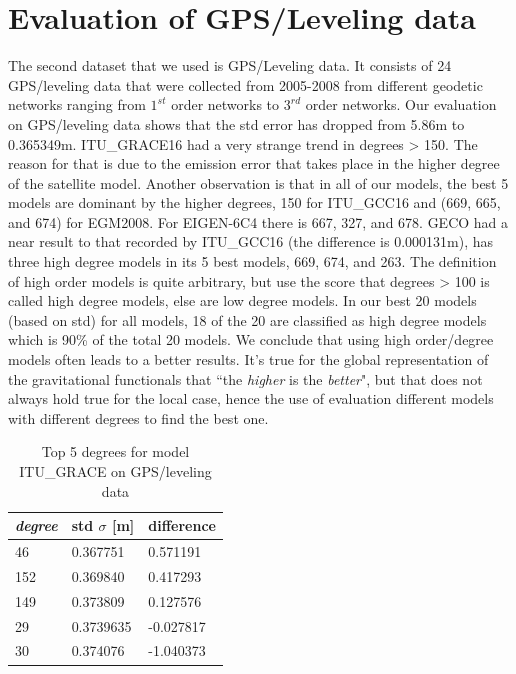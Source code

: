         \section{Evaluation of GPS/Leveling data}
        The second dataset that we used is GPS/Leveling data. It consists of 24 GPS/leveling data that were collected from 2005-2008 from different geodetic networks ranging from $1^{st}$ order networks to $3^{rd}$ order networks. Our evaluation on GPS/leveling data shows that the std error has dropped from 5.86m to 0.365349m. ITU\_GRACE16 had a very strange trend in degrees > 150. The reason for that is due to the emission error that takes place in the higher degree of the satellite model.
        Another observation is that in all of our models, the best 5 models are dominant by the higher degrees, 150 for ITU\_GCC16 and (669, 665, and 674) for EGM2008. For EIGEN-6C4 there is 667, 327, and 678. GECO had a near result to that recorded by ITU\_GCC16 (the difference is 0.000131m), has three high degree models in its 5 best models, 669, 674, and 263. The definition of high order models is quite arbitrary, but use the score that degrees > 100 is called high degree models, else are low degree models. In our best 20 models (based on std) for all models, 18 of the 20 are classified as high degree models which is 90\% of the total 20 models. We conclude that using high order/degree models often leads to a better results. It's true for the global representation of the gravitational functionals that ``the \textit{higher} is the \textit{better}", but that does not always hold true for the local case, hence the use of evaluation different models with different degrees to find the best one. 
          \begin{table}[]
          	\centering
          	\caption{Top 5 degrees for model ITU\_GRACE on GPS/leveling data}
          	\label{table:ggm_models}
          	\begin{tabular}{@{}lll@{}}
          		\toprule
          		\emph{degree} & std $\sigma$ [m]  & difference\\ \midrule
          		46 &0.367751&    0.571191\\
          		152 &0.369840&   0.417293\\
          		149 &0.373809 &  0.127576\\
          		29 &0.3739635 &  -0.027817\\
          		30 &0.374076  & -1.040373\\
          		\bottomrule
          		
          	\end{tabular}
          \end{table}
          
